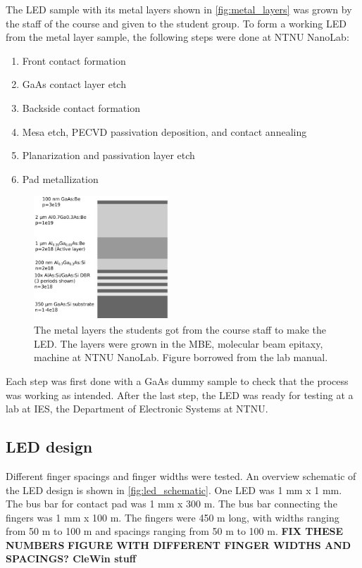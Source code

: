 
The LED sample with its metal layers shown in \autoref{fig:metal_layers} was grown by the staff of the course and given to the student group.
To form a working LED from the metal layer sample, the following steps were done at NTNU NanoLab:

\begin{enumerate}
    \item Front contact formation
    \item GaAs contact layer etch
    \item Backside contact formation
    \item Mesa etch, PECVD passivation deposition, and contact annealing
    \item Planarization and passivation layer etch
    \item Pad metallization
\end{enumerate}

\begin{figure}[h]
    \centering
    \includegraphics[width=0.45\textwidth]{figures/metal_layers.jpg}
    \caption{
        The metal layers the students got from the course staff to make the LED.
        The layers were grown in the MBE, molecular beam epitaxy, machine at NTNU NanoLab.
        Figure borrowed from the lab manual.
    }
    \label{fig:metal_layers}

\end{figure}

Each step was first done with a GaAs dummy sample to check that the process was working as intended.
After the last step, the LED was ready for testing at a lab at IES, the Department of Electronic Systems at NTNU.


\subsection{LED design}
\label{methods:led_design}

Different finger spacings and finger widths were tested.
An overview schematic of the LED design is shown in \autoref{fig:led_schematic}.
One LED was 1 mm x 1 mm.
The bus bar for contact pad was 1 mm x 300 \textmu m.
The bus bar connecting the fingers was 1 mm x 100 \textmu m.
The fingers were 450 \textmu m long, with widths ranging from 50 \textmu m to 100 \textmu m and spacings ranging from 50 \textmu m to 100 \textmu m.
\textbf{FIX THESE NUMBERS}
\textbf{FIGURE WITH DIFFERENT FINGER WIDTHS AND SPACINGS? CleWin stuff}


